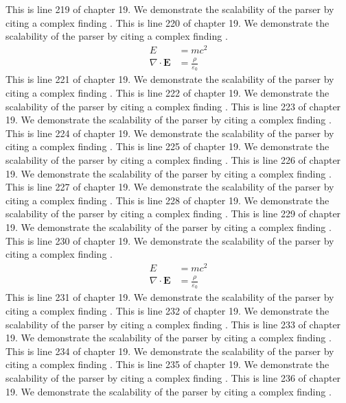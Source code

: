 This is line 219 of chapter 19. We demonstrate the scalability of the parser by citing a complex finding \cite{ref19_219}.
This is line 220 of chapter 19. We demonstrate the scalability of the parser by citing a complex finding \cite{ref19_220}.
\begin{align*}
  E &= mc^2 \\
  \nabla \cdot \mathbf{E} &= \frac{\rho}{\varepsilon_0}
\end{align*}
This is line 221 of chapter 19. We demonstrate the scalability of the parser by citing a complex finding \cite{ref19_221}.
This is line 222 of chapter 19. We demonstrate the scalability of the parser by citing a complex finding \cite{ref19_222}.
This is line 223 of chapter 19. We demonstrate the scalability of the parser by citing a complex finding \cite{ref19_223}.
This is line 224 of chapter 19. We demonstrate the scalability of the parser by citing a complex finding \cite{ref19_224}.
This is line 225 of chapter 19. We demonstrate the scalability of the parser by citing a complex finding \cite{ref19_225}.
This is line 226 of chapter 19. We demonstrate the scalability of the parser by citing a complex finding \cite{ref19_226}.
This is line 227 of chapter 19. We demonstrate the scalability of the parser by citing a complex finding \cite{ref19_227}.
This is line 228 of chapter 19. We demonstrate the scalability of the parser by citing a complex finding \cite{ref19_228}.
This is line 229 of chapter 19. We demonstrate the scalability of the parser by citing a complex finding \cite{ref19_229}.
This is line 230 of chapter 19. We demonstrate the scalability of the parser by citing a complex finding \cite{ref19_230}.
\begin{align*}
  E &= mc^2 \\
  \nabla \cdot \mathbf{E} &= \frac{\rho}{\varepsilon_0}
\end{align*}
This is line 231 of chapter 19. We demonstrate the scalability of the parser by citing a complex finding \cite{ref19_231}.
This is line 232 of chapter 19. We demonstrate the scalability of the parser by citing a complex finding \cite{ref19_232}.
This is line 233 of chapter 19. We demonstrate the scalability of the parser by citing a complex finding \cite{ref19_233}.
This is line 234 of chapter 19. We demonstrate the scalability of the parser by citing a complex finding \cite{ref19_234}.
This is line 235 of chapter 19. We demonstrate the scalability of the parser by citing a complex finding \cite{ref19_235}.
This is line 236 of chapter 19. We demonstrate the scalability of the parser by citing a complex finding \cite{ref19_236}.
